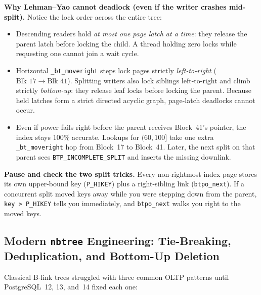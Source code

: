 \begin{whybox}
\textbf{Why Lehman--Yao cannot deadlock (even if the writer crashes mid-split).} Notice the lock order across the entire tree:
\begin{itemize}
  \item Descending readers hold \emph{at most one page latch at a time}: they release the parent latch before locking the child. A thread holding zero locks while requesting one cannot join a wait cycle.
  \item Horizontal \texttt{\_bt\_moveright} steps lock pages strictly \emph{left-to-right} ($\text{Blk } 17 \to \text{Blk } 41$). Splitting writers also lock siblings left-to-right and climb strictly \emph{bottom-up}: they release leaf locks before locking the parent. Because held latches form a strict directed acyclic graph, page-latch deadlocks cannot occur.
  \item Even if power fails right before the parent receives Block~41's pointer, the index stays $100\%$ accurate. Lookups for $(60, 100]$ take one extra \texttt{\_bt\_moveright} hop from Block~17 to Block~41. Later, the next split on that parent sees \texttt{BTP\_INCOMPLETE\_SPLIT} and inserts the missing downlink.
\end{itemize}
\end{whybox}

\begin{recoverybox}
\textbf{Pause and check the two split tricks.} Every non-rightmost index page stores its own upper-bound key (\texttt{P\_HIKEY}) plus a right-sibling link (\texttt{btpo\_next}). If a concurrent split moved keys away while you were stepping down from the parent, \texttt{key > P\_HIKEY} tells you immediately, and \texttt{btpo\_next} walks you right to the moved keys.
\end{recoverybox}

\subsection{Modern \texttt{nbtree} Engineering: Tie-Breaking, Deduplication, and Bottom-Up Deletion}

Classical B-link trees struggled with three common OLTP patterns until PostgreSQL~12, 13, and~14 fixed each one:

